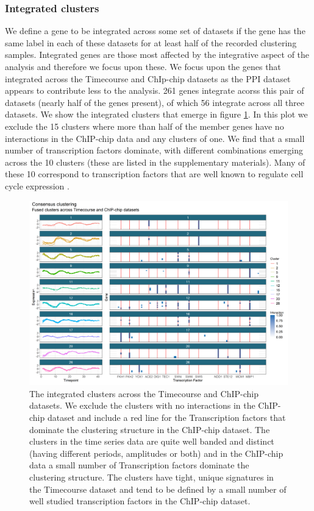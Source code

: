 \documentclass{bioinfo}
\begin{document}
\subsubsection{Integrated clusters}
We define a gene to be integrated across some set of datasets if the gene has the same label in each of these datasets for at least half of the recorded clustering samples. Integrated genes are those most affected by the integrative aspect of the analysis and therefore we focus upon these. We focus upon the genes that integrated across the Timecourse and ChIp-chip datasets as the PPI dataset appears to contribute less to the analysis. 261 genes integrate acorss this pair of datasets (nearly half of the genes present), of which 56 integrate across all three datasets. We show the integrated clusters that emerge in figure \ref{fig:timepointChIPchipFused}. In this plot we exclude the 15 clusters where more than half of the member genes have no interactions in the ChIP-chip data and any clusters of one. We find that a small number of transcription factors dominate, with different combinations emerging across the 10 clusters (these are listed in the supplementary materials). Many of these 10 correspond to transcription factors that are well known to regulate cell cycle expression \citep{simon2001serial}.

\begin{figure}
	\centering
	\includegraphics[scale=0.5]{./SupplementaryMaterial/Images/Yeast/timecourseChIPchipFused.png}
	\caption{The integrated clusters across the Timecourse and ChIP-chip datasets. We exclude the clusters with no interactions in the ChIP-chip dataset and include a red line for the Transcription factors that dominate the clustering structure in the ChIP-chip dataset. The clusters in the time series data are quite well banded and distinct (having different periods, amplitudes or both) and in the ChIP-chip data a small number of Transcription factors dominate the clustering structure. The clusters have tight, unique signatures in the Timecourse dataset and tend to be defined by a small number of well studied transcription factors in the ChIP-chip dataset.}
	\label{fig:timepointChIPchipFused}
\end{figure}
\end{document}
